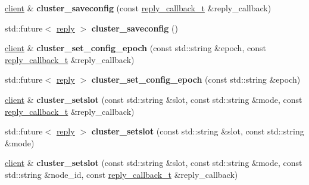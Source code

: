 \begin{DoxyCompactItemize}
\item 
\mbox{\label{classcpp__redis_1_1client_a2860dbeb1f7acd44e72e3ad02fc16e20}} 
\hyperlink{classcpp__redis_1_1client}{client} \& {\bfseries cluster\+\_\+saveconfig} (const \hyperlink{classcpp__redis_1_1client_a061a1140d36d2eaeda82b09a0bb3f9f2}{reply\+\_\+callback\+\_\+t} \&reply\+\_\+callback)
\item 
\mbox{\label{classcpp__redis_1_1client_a5b8571b48e9e56fad203a04dd50559be}} 
std\+::future$<$ \hyperlink{classcpp__redis_1_1reply}{reply} $>$ {\bfseries cluster\+\_\+saveconfig} ()
\item 
\mbox{\label{classcpp__redis_1_1client_ac930f6544459b0b2476f741beb6a2508}} 
\hyperlink{classcpp__redis_1_1client}{client} \& {\bfseries cluster\+\_\+set\+\_\+config\+\_\+epoch} (const std\+::string \&epoch, const \hyperlink{classcpp__redis_1_1client_a061a1140d36d2eaeda82b09a0bb3f9f2}{reply\+\_\+callback\+\_\+t} \&reply\+\_\+callback)
\item 
\mbox{\label{classcpp__redis_1_1client_a0be11e04ce58a13e2e40272be1fad788}} 
std\+::future$<$ \hyperlink{classcpp__redis_1_1reply}{reply} $>$ {\bfseries cluster\+\_\+set\+\_\+config\+\_\+epoch} (const std\+::string \&epoch)
\item 
\mbox{\label{classcpp__redis_1_1client_aeba14289869fe871eb9eb9c2503635a8}} 
\hyperlink{classcpp__redis_1_1client}{client} \& {\bfseries cluster\+\_\+setslot} (const std\+::string \&slot, const std\+::string \&mode, const \hyperlink{classcpp__redis_1_1client_a061a1140d36d2eaeda82b09a0bb3f9f2}{reply\+\_\+callback\+\_\+t} \&reply\+\_\+callback)
\item 
\mbox{\label{classcpp__redis_1_1client_ad9b75e2c90b1b87fa93a3ac76bd1512f}} 
std\+::future$<$ \hyperlink{classcpp__redis_1_1reply}{reply} $>$ {\bfseries cluster\+\_\+setslot} (const std\+::string \&slot, const std\+::string \&mode)
\item 
\mbox{\label{classcpp__redis_1_1client_a4e87a3163d16db267136a127e5c843e2}} 
\hyperlink{classcpp__redis_1_1client}{client} \& {\bfseries cluster\+\_\+setslot} (const std\+::string \&slot, const std\+::string \&mode, const std\+::string \&node\+\_\+id, const \hyperlink{classcpp__redis_1_1client_a061a1140d36d2eaeda82b09a0bb3f9f2}{reply\+\_\+callback\+\_\+t} \&reply\+\_\+callback)

\end{DoxyCompactItemize}
